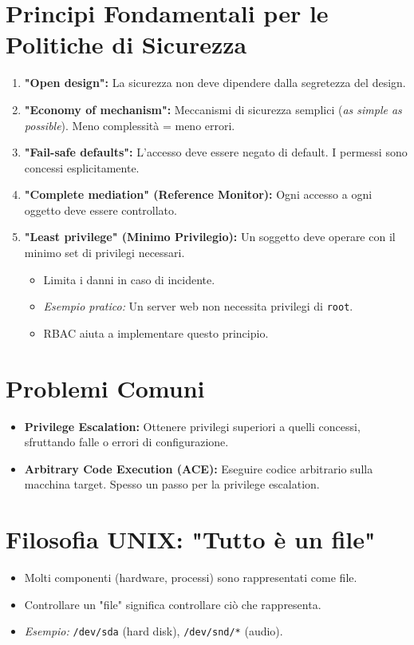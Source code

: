 \section{Principi Fondamentali per le Politiche di Sicurezza}
\begin{enumerate}
    \item \textbf{"Open design":} La sicurezza non deve dipendere dalla segretezza del design.
    \item \textbf{"Economy of mechanism":} Meccanismi di sicurezza semplici (\textit{as simple as possible}). Meno complessità = meno errori.
    \item \textbf{"Fail-safe defaults":} L'accesso deve essere negato di default. I permessi sono concessi esplicitamente.
    \item \textbf{"Complete mediation" (Reference Monitor):} Ogni accesso a ogni oggetto deve essere controllato.
    \item \textbf{"Least privilege" (Minimo Privilegio):} Un soggetto deve operare con il minimo set di privilegi necessari.
    \begin{itemize}
        \item Limita i danni in caso di incidente.
        \item \textit{Esempio pratico:} Un server web non necessita privilegi di \texttt{root}.
        \item RBAC aiuta a implementare questo principio.
    \end{itemize}
\end{enumerate}

\section{Problemi Comuni}
\begin{itemize}
    \item \textbf{Privilege Escalation:} Ottenere privilegi superiori a quelli concessi, sfruttando falle o errori di configurazione.
    \item \textbf{Arbitrary Code Execution (ACE):} Eseguire codice arbitrario sulla macchina target. Spesso un passo per la privilege escalation.
\end{itemize}

\section{Filosofia UNIX: "Tutto è un file"}
\begin{itemize}
    \item Molti componenti (hardware, processi) sono rappresentati come file.
    \item Controllare un "file" significa controllare ciò che rappresenta.
    \item \textit{Esempio:} \texttt{/dev/sda} (hard disk), \texttt{/dev/snd/*} (audio).
\end{itemize}

